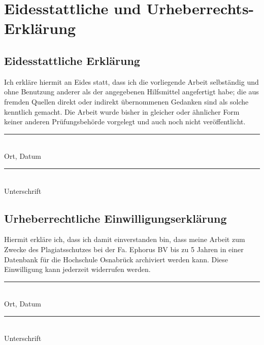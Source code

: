 
\chapter*{Eidesstattliche und Urheberrechts-Erklärung}

\thispagestyle{hsos-only-logo}
\vspace{1cm}
\section*{Eidesstattliche Erklärung}
Ich erkläre hiermit an Eides statt, dass ich die vorliegende Arbeit selbständig und ohne Benutzung
anderer als der angegebenen Hilfsmittel angefertigt habe; die aus fremden Quellen direkt oder indirekt
übernommenen Gedanken sind als solche kenntlich gemacht. Die Arbeit wurde bisher in gleicher oder
ähnlicher Form keiner anderen Prüfungsbehörde vorgelegt und auch noch nicht veröffentlicht.

\parbox{\textwidth}{
	\vspace{2cm}
	
	\parbox{6cm}{
		\rule{5cm}{1pt}\\
		Ort, Datum
	}
	\hspace{1cm}
	\parbox{8cm}{
		\rule{7cm}{1pt}\\
		Unterschrift
	}
}
\vspace{1cm}

\section*{Urheberrechtliche Einwilligungserklärung}
Hiermit erkläre ich, dass ich damit einverstanden bin, dass meine Arbeit zum Zwecke des Plagiatsschutzes bei der Fa. Ephorus BV bis zu 5 Jahren in einer Datenbank für die Hochschule Osnabrück archiviert werden kann. Diese Einwilligung kann jederzeit widerrufen werden. 

\parbox{\textwidth}{
	\vspace{2cm}
	
	\parbox{6cm}{
		\rule{5cm}{1pt}\\
		Ort, Datum
	}
	\hspace{1cm}
	\parbox{8cm}{
		\rule{7cm}{1pt}\\
		Unterschrift
	}
}
